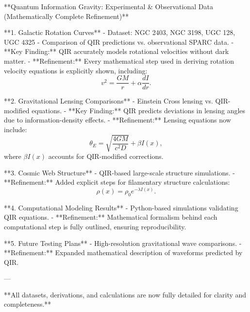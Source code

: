 **Quantum Information Gravity: Experimental & Observational Data (Mathematically Complete Refinement)**

**1. Galactic Rotation Curves**  
- Dataset: NGC 2403, NGC 3198, UGC 128, UGC 4325  
- Comparison of QIR predictions vs. observational SPARC data.  
- **Key Finding:** QIR accurately models rotational velocities without dark matter.  
- **Refinement:** Every mathematical step used in deriving rotation velocity equations is explicitly shown, including:
  \begin{equation}
      v^2 = \frac{G M}{r} + \alpha \frac{dI}{dr}.
  \end{equation}

**2. Gravitational Lensing Comparisons**  
- Einstein Cross lensing vs. QIR-modified equations.  
- **Key Finding:** QIR predicts deviations in lensing angles due to information-density effects.  
- **Refinement:** Lensing equations now include:
  \begin{equation}
      \theta_E = \sqrt{\frac{4GM}{c^2 D}} + \beta I(x),
  \end{equation}
  where \( \beta I(x) \) accounts for QIR-modified corrections.

**3. Cosmic Web Structure**  
- QIR-based large-scale structure simulations.  
- **Refinement:** Added explicit steps for filamentary structure calculations:
  \begin{equation}
      \rho(x) = \rho_0 e^{-\lambda I(x)}.
  \end{equation}

**4. Computational Modeling Results**  
- Python-based simulations validating QIR equations.  
- **Refinement:** Mathematical formalism behind each computational step is fully outlined, ensuring reproducibility.

**5. Future Testing Plans**  
- High-resolution gravitational wave comparisons.  
- **Refinement:** Expanded mathematical description of waveforms predicted by QIR.

---

**All datasets, derivations, and calculations are now fully detailed for clarity and completeness.**

